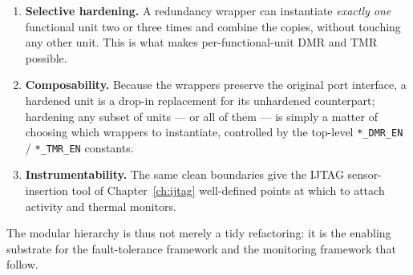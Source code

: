 \begin{enumerate}
  \item \textbf{Selective hardening.} A redundancy wrapper can instantiate
        \emph{exactly one} functional unit two or three times and combine the
        copies, without touching any other unit. This is what makes
        per-functional-unit DMR and TMR possible.
  \item \textbf{Composability.} Because the wrappers preserve the original port
        interface, a hardened unit is a drop-in replacement for its unhardened
        counterpart; hardening any subset of units --- or all of them --- is
        simply a matter of choosing which wrappers to instantiate, controlled by
        the top-level \texttt{*\_DMR\_EN} / \texttt{*\_TMR\_EN} constants.
  \item \textbf{Instrumentability.} The same clean boundaries give the IJTAG
        sensor-insertion tool of Chapter~\ref{ch:ijtag} well-defined points at
        which to attach activity and thermal monitors.
\end{enumerate}

The modular hierarchy is thus not merely a tidy refactoring: it is the
enabling substrate for the fault-tolerance framework and the monitoring framework
that follow.
